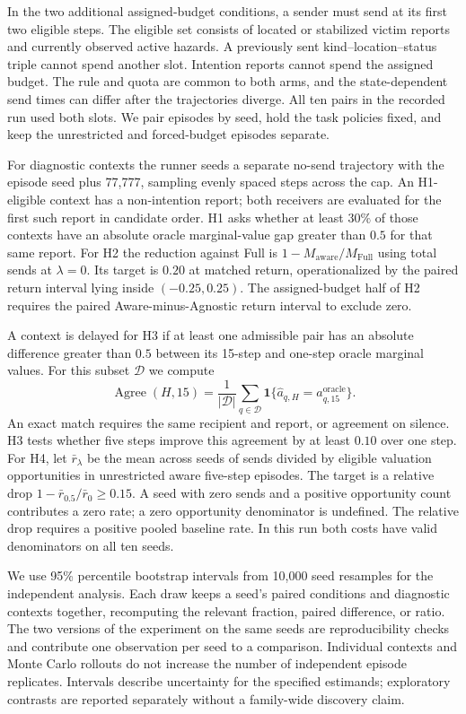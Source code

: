 \documentclass{article}
\newcommand{\Agree}{\operatorname{Agree}}
\newcommand{\indicator}{\mathbf{1}}
\begin{document}
In the two additional assigned-budget conditions, a sender must send at its first two eligible steps. The eligible set consists of located or stabilized victim reports and currently observed active hazards. A previously sent kind--location--status triple cannot spend another slot. Intention reports cannot spend the assigned budget. The rule and quota are common to both arms, and the state-dependent send times can differ after the trajectories diverge. All ten pairs in the recorded run used both slots. We pair episodes by seed, hold the task policies fixed, and keep the unrestricted and forced-budget episodes separate.

For diagnostic contexts the runner seeds a separate no-send trajectory with the episode seed plus 77,777, sampling evenly spaced steps across the cap. An H1-eligible context has a non-intention report; both receivers are evaluated for the first such report in candidate order. H1 asks whether at least $30\%$ of those contexts have an absolute oracle marginal-value gap greater than $0.5$ for that same report. For H2 the reduction against Full is $1-M_{\mathrm{aware}}/M_{\mathrm{Full}}$ using total sends at $\lambda=0$. Its target is $0.20$ at matched return, operationalized by the paired return interval lying inside $(-0.25,0.25)$. The assigned-budget half of H2 requires the paired Aware-minus-Agnostic return interval to exclude zero.

A context is delayed for H3 if at least one admissible pair has an absolute difference greater than $0.5$ between its 15-step and one-step oracle marginal values. For this subset $\mathcal D$ we compute
\begin{equation}
 \Agree(H,15)=\frac{1}{|\mathcal D|}
 \sum_{q\in\mathcal D}\indicator\{\widehat a_{q,H}=a^{\mathrm{oracle}}_{q,15}\}.
 \label{eq:agreement}
\end{equation}
An exact match requires the same recipient and report, or agreement on silence. H3 tests whether five steps improve this agreement by at least $0.10$ over one step. For H4, let $\bar r_\lambda$ be the mean across seeds of sends divided by eligible valuation opportunities in unrestricted aware five-step episodes. The target is a relative drop $1-\bar r_{0.5}/\bar r_0\ge 0.15$. A seed with zero sends and a positive opportunity count contributes a zero rate; a zero opportunity denominator is undefined. The relative drop requires a positive pooled baseline rate. In this run both costs have valid denominators on all ten seeds.

We use 95\% percentile bootstrap intervals from 10,000 seed resamples for the independent analysis. Each draw keeps a seed's paired conditions and diagnostic contexts together, recomputing the relevant fraction, paired difference, or ratio. The two versions of the experiment on the same seeds are reproducibility checks and contribute one observation per seed to a comparison. Individual contexts and Monte Carlo rollouts do not increase the number of independent episode replicates. Intervals describe uncertainty for the specified estimands; exploratory contrasts are reported separately without a family-wide discovery claim.
\end{document}
